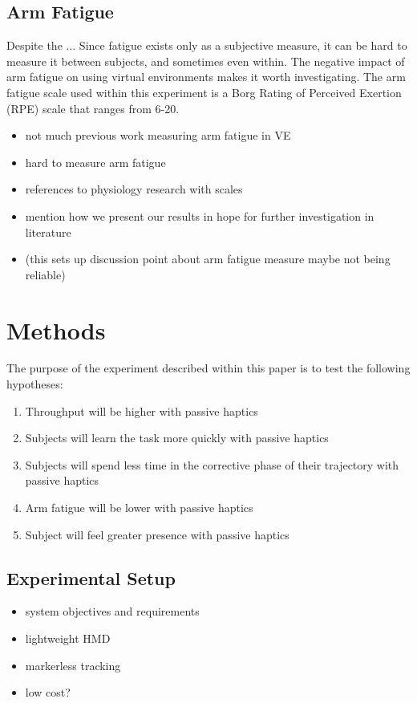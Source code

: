 \subsection{Arm Fatigue}

Despite the ...
Since fatigue exists only as a subjective measure, it can be hard to measure it between subjects, and sometimes even within.
The negative impact of arm fatigue on using virtual environments makes it worth investigating.
The arm fatigue scale used within this experiment is a Borg Rating of Perceived Exertion (RPE) scale that ranges from 6-20.

\begin{itemize}
  \item not much previous work measuring arm fatigue in VE
  \item hard to measure arm fatigue
  \item references to physiology research with scales
  \item mention how we present our results in hope for further investigation in literature
  \item (this sets up discussion point about arm fatigue measure maybe not being reliable)
\end{itemize}

\section{Methods}

The purpose of the experiment described within this paper is to test the following hypotheses:

\begin{enumerate}[label={H\arabic*.}]
    \item Throughput will be higher with passive haptics
    \item Subjects will learn the task more quickly with passive haptics
    \item Subjects will spend less time in the corrective phase of their trajectory with passive haptics
    \item Arm fatigue will be lower with passive haptics
    \item Subject will feel greater presence with passive haptics
\end{enumerate}

\subsection{Experimental Setup}
\begin{itemize}
  \item system objectives and requirements
  \item lightweight HMD
  \item markerless tracking
  \item low cost?
\end{itemize}

